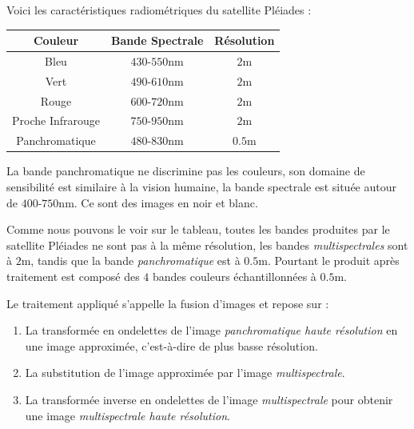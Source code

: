 \documentclass[a4paper, 11pt]{report}
\begin{document}
Voici les caractéristiques radiométriques du satellite Pléiades :
\begin{center}
	\begin{tabular}{|c|c|c|}
	\hline
	Couleur & Bande Spectrale & Résolution \\
	\hline 
	Bleu & $430$-$550$nm & $2$m \\ 
	\hline 
	Vert & $490$-$610$nm & $2$m \\ 
	\hline 
	Rouge & $600$-$720$nm & $2$m \\ 
	\hline 
	Proche Infrarouge & $750$-$950$nm & $2$m \\ 
	\hline 
	Panchromatique & $480$-$830$nm & $0.5$m \\ 
	\hline 
	\end{tabular}
\end{center}
La bande panchromatique ne discrimine pas les couleurs, son domaine de sensibilité est similaire à la vision humaine, la bande spectrale est située autour de $400$-$750$nm. Ce sont des images en noir et blanc.

Comme nous pouvons le voir sur le tableau, toutes les bandes produites par le satellite Pléiades ne sont pas à la même résolution, les bandes \emph{multispectrales} sont à $2$m, tandis que la bande \emph{panchromatique} est à $0.5$m.
Pourtant le produit après traitement est composé des $4$ bandes couleurs échantillonnées à $0.5$m.

Le traitement appliqué s'appelle la fusion d'images et repose sur :
\begin{enumerate}
	\item La transformée en ondelettes de l'image \emph{panchromatique haute résolution} en une image approximée, c'est-à-dire de plus basse résolution.
	\item La substitution de l'image approximée par l'image \emph{multispectrale}.
	\item La transformée inverse en ondelettes de l'image \emph{multispectrale} pour obtenir une image \emph{multispectrale haute résolution}.
\end{enumerate}
\end{document}
